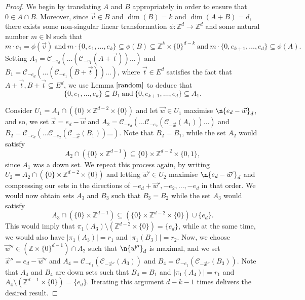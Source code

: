 \begin{proof}
We begin by translating $A$ and $B$ appropriately in order to ensure that $0 \in A \cap B$. Moreover, since $\vec{v} \in B$ and $\dim(B) = k$ and $\dim(A+B) = d$, there exists some non-singular linear transformation $\phi : \mathbb{Z}^d \to \mathbb{Z}^d$ and some natural number $m \in \mathbb{N}$ such that
\[ m \cdot e_1 = \phi(\vec{v}) \ \text{and} \ m \cdot \{0, e_1, \dots, e_k\} \subseteq \phi(B) \subseteq \mathbb{Z}^k \times \{0\}^{d-k} \ \text{and} \ m \cdot \{ 0,e_{k+1} , \dots, e_{d} \} \subseteq \phi(A). \]
Setting $A_1 = \mathcal{C}_{-e_d}(\dots ( \mathcal{C}_{-e_1}(A+ \vec{t})) \dots )$ and $B_1 =\mathcal{C}_{-e_d}(\dots ( \mathcal{C}_{-e_1}(B +\vec{t})) \dots )$, where $\vec{t} \in E^d$ satisfies the fact that $A+ \vec{t}, B+ \vec{t} \subseteq E^d$, we use Lemma $\ref{random}$ to deduce that
\[ \{0, e_1,\dots, e_k \} \subseteq B_1 \ \text{and} \ \{0, e_{k+1}, \dots, e_d \} \subseteq A_1. \]
\par

Consider $U_1 = A_1 \cap (\{0\} \times \mathbb{Z}^{d-2} \times \{0\})$ and let $\vec{w} \in U_1$ maximise $\n{e_{d} - \vec{w}}_{d}$, and so, we set $\vec{x} = e_d - \vec{w}$ and $A_2 = \mathcal{C}_{-e_{d}}(\dots  \mathcal{C}_{-e_{2}}(  \mathcal{C}_{-\vec{x}}( A_1 ) ) \dots )$ and $B_2 = \mathcal{C}_{-e_{d}}(\dots  \mathcal{C}_{-e_{2}}(  \mathcal{C}_{-\vec{x}}( B_1 ) ) \dots )$. Note that $B_2 = B_1$, while the set $A_2$ would satisfy 
\[ A_2 \cap (\{0\} \times \mathbb{Z}^{d-1}) \subseteq \{0\} \times \mathbb{Z}^{d-2} \times\{0,1\}, \]
since $A_1$ was a down set. We repeat this process again, by writing $U_2 = A_2 \cap (\{0\} \times \mathbb{Z}^{d-2} \times \{0\})$ and letting $\vec{w}' \in U_2$ maximise $\n{e_{d} - \vec{w}'}_{d}$ and compressing our sets in the directions of $-e_d + \vec{w}', -e_2, \dots, -e_d$ in that order. We would now obtain sets $A_3$ and $B_3$ such that $B_3 = B_2$ while the set $A_3$ would satisfy
\[ A_3 \cap (\{0\} \times \mathbb{Z}^{d-1}) \subseteq (\{0\} \times \mathbb{Z}^{d-2} \times\{0\}) \cup \{ e_d\}. \]
This would imply that $\pi_{1}(A_3) \setminus (\mathbb{Z}^{d-2} \times \{0\}) = \{ e_{d}\}$, while at the same time, we would also have $|\pi_1(A_3)| = r_1$ and $|\pi_1(B_3)| = r_2$. Now, we choose $\vec{w}'' \in (\mathbb{Z} \times \{0\}^{d-1}) \cap A_2$ such that $\n{\vec{w}''}_{d}$ is maximal, and we set $\vec{x}'' = e_{d} - \vec{w}''$ and $A_4 = \mathcal{C}_{-e_1}(\mathcal{C}_{-\vec{x}''}(A_3))$ and $B_4 = \mathcal{C}_{-e_1}(\mathcal{C}_{-\vec{x}''}(B_3))$. Note that $A_4$ and $B_4$ are down sets such that $B_4= B_1$ and $|\pi_1(A_4)|= r_1$ and $A_4 \setminus (\mathbb{Z}^{d-1} \times \{0\}) = \{e_{d}\}$. Iterating this argument $d-k-1$ times delivers the desired result.
%
\end{proof}






